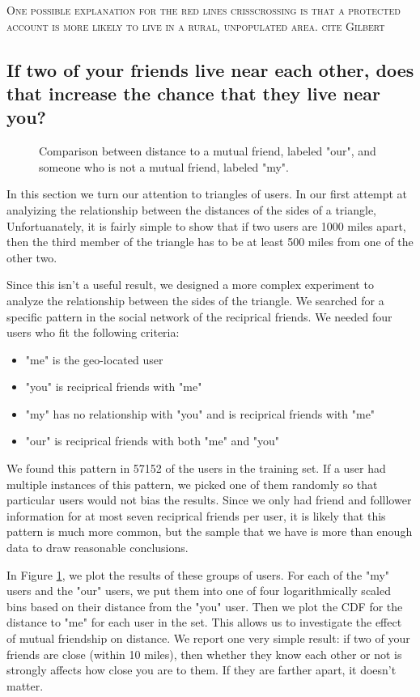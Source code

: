 \documentclass{sig-alternate}
\begin{document}
\textsc{One possible explanation for the red lines crisscrossing is that a
protected account is more likely to live in a rural, unpopulated area. cite
Gilbert}

\subsection{If two of your friends live near each other, does that increase the chance that they live near you?}
\begin{figure}
\centering
{}
\caption{
Comparison between distance to a mutual friend, labeled "our", and someone who is not a mutual friend, labeled "my".
}
\label{fig:NearTriads}
\end{figure}
In this section we turn our attention to triangles of users.
In our first attempt at analyizing the relationship between the distances of the sides of a triangle, 
Unfortuanately, it is fairly simple to show that if two users are 1000 miles apart, then the third member of the triangle has to be at least 500 miles from one of the other two.

Since this isn't a useful result, we designed a more complex experiment to analyze the relationship between the sides of the triangle.
We searched for a specific pattern in the social network of the reciprical friends.  We needed four users who fit the following criteria:
\begin{itemize}
\item "me" is the geo-located user
\item "you" is reciprical friends with "me"
\item "my" has no relationship with "you" and is reciprical friends with "me"
\item "our" is reciprical friends with both "me" and "you"
\end{itemize}

We found this pattern in 57152 of the users in the training set. If a user had multiple instances of this pattern, we picked one of them randomly so that particular users would not bias the results.
Since we only had friend and folllower information for at most seven reciprical friends per user, it is likely that this pattern is much more common, but the sample that we have is more than enough data to draw reasonable conclusions.

In Figure \ref{fig:NearTriads}, we plot the results of these groups of users.
For each of the "my" users and the "our" users, we put them into one of four logarithmically scaled bins based on their distance from the "you" user. Then we plot the CDF for the distance to "me" for each user in the set. This allows us to investigate the effect of mutual friendship on distance.
We report one very simple result: if two of your friends are close (within 10 miles), then whether they know each other or not is strongly affects how close you are to them. If they are farther apart, it doesn't matter.
\end{document}
